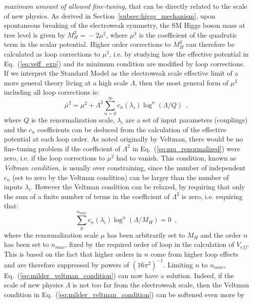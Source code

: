 \documentclass[prd,preprint,aps,floats,superscriptaddress,floatfix,nofootinbib]{revtex4}
\begin{document}
\emph{maximum amount of allowed fine-tuning}, that can be directly
related to the scale of new physics. As derived in
Section~\ref{subsec:higgs_mechanism}, upon spontaneous breaking of the
electroweak symmetry, the SM Higgs boson mass at tree level is given
by $M_H^2\!=\!-2\mu^2$, where $\mu^2$ is the coefficient of the
quadratic term in the scalar potential. Higher order corrections to
$M_H^2$ can therefore be calculated as loop corrections to $\mu^2$,
i.e. by studying how the effective potential in
Eq.~(\ref{eq:veff_exp}) and its minimum condition are modified by loop
corrections.  If we interpret the Standard Model as the electroweak
scale effective limit of a more general theory living at a high scale
$\Lambda$, then the most general form of $\mu^2$ including all loop
corrections is:
\begin{equation}
\label{eq:mu_renormalized}
\bar\mu^2=\mu^2+\Lambda^2\sum_{n=0}^{\infty}c_n(\lambda_i)\log^n(\Lambda/Q)
\,\,\,,
\end{equation}
where $Q$ is the renormalization scale, $\lambda_i$ are a set of input
parameters (couplings) and the $c_n$ coefficients can be deduced from
the calculation of the effective potential at each loop order. As
noted originally by Veltman, there would be no fine-tuning problem if
the coefficient of $\Lambda^2$ in Eq.~(\ref{eq:mu_renormalized}) were
zero, i.e. if the loop corrections to $\mu^2$ had to vanish. This
condition, known as \emph{Veltman condition}, is usually over constraining,
since the number of independent $c_n$ (set to zero by the Veltman
condition) can be larger than the number of inputs
$\lambda_i$. However the Veltman condition can be relaxed, by
requiring that only the sum of a finite number of terms in the
coefficient of $\Lambda^2$ is zero, i.e. requiring that:
\begin{equation}
\label{eq:milder_veltman_condition}
\sum_0^{n_{max}}c_n(\lambda_i)\log^n(\Lambda/M_H)=0\,\,\,,
\end{equation}
where the renormalization scale $\mu$ has been arbitrarily set to
$M_H$ and the order $n$ has been set to $n_{max}$, fixed by the
required order of loop in the calculation of $V_{eff}$. This is based
on the fact that higher orders in $n$ come from higher loop effects
and are therefore suppressed by powers of $(16\pi^2)^{-1}$. Limiting
$n$ to $n_{max}$, Eq.~(\ref{eq:milder_veltman_condition}) can now have
a solution. Indeed, if the scale of new physics $\Lambda$ is not too
far from the electroweak scale, then the Veltman condition in
Eq.~(\ref{eq:milder_veltman_condition}) can be softened even more by
\end{document}
